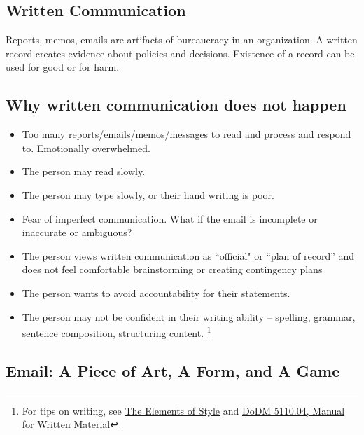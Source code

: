 \subsection{Written Communication\label{sec:written-communication}}

Reports, memos, emails are artifacts of bureaucracy in an organization. A written record creates evidence about policies and decisions. Existence of a record can be used for good or for harm.







\subsection*{Why written communication does not happen\label{sec:written-comm-does-not-happen}}
\begin{itemize}
    \item Too many reports/emails/memos/messages to read and process and respond to. Emotionally overwhelmed.
\item The person may read slowly.
\item The person may type slowly, or their hand writing is poor.
\item Fear of imperfect communication. What if the email is incomplete or inaccurate or ambiguous?
\item The person views written communication as ``official" or ``plan of record'' and does not feel comfortable brainstorming or creating contingency plans
\item The person wants to avoid accountability for their statements.
\item The person may not be confident in their writing ability -- spelling, grammar, sentence composition, structuring content. \footnote{For tips on writing, see 
\href{https://en.wikipedia.org/wiki/The_Elements_of_Style}{The Elements of Style}
and
\href{https://www.google.com/search?q=dodm+5110.04}{DoDM 5110.04, Manual for Written Material}}
\end{itemize}




\subsection*{Email: A Piece of Art, A Form, and A Game\label{sec:art-form-game}}


